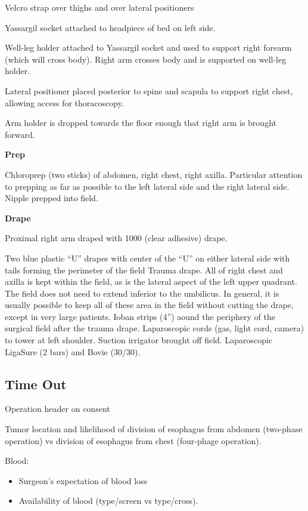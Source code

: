 \documentclass[
]{book}
\providecommand{\tightlist}{%
  \setlength{\itemsep}{0pt}\setlength{\parskip}{0pt}}
\begin{document}
Velcro strap over thighs and over lateral positioners

Yassargil socket attached to headpiece of bed on left side.

Well-leg holder attached to Yassargil socket and used to support right forearm (which will cross body). Right arm crosses body and is supported on well-leg holder.

Lateral positioner placed posterior to spine and scapula to support right chest, allowing access for thoracoscopy.

Arm holder is dropped towards the floor enough that right arm is brought forward.

\textbf{Prep}

Chloroprep (two sticks) of abdomen, right chest, right axilla. Particular attention to prepping as far as possible to the left lateral side and the right lateral side. Nipple prepped into field.

\textbf{Drape}

Proximal right arm draped with 1000 (clear adhesive) drape.

Two blue plastic ``U'' drapes with center of the ``U'' on either lateral side with tails forming the perimeter of the field Trauma drape. All of right chest and axilla is kept within the field, as is the lateral aspect of the left upper quadrant. The field does not need to extend inferior to the umbilicus. In general, it is usually possible to keep all of these area in the field without cutting the drape, except in very large patients. Ioban strips (4'') aound the periphery of the surgical field after the trauma drape. Laparoscopic cords (gas, light cord, camera) to tower at left shoulder. Suction irrigator brought off field. Laparoscopic LigaSure (2 bars) and Bovie (30/30).

\hypertarget{time-out}{%
\subsection{Time Out}\label{time-out}}

Operation header on consent

Tumor location and likelihood of division of esophagus from abdomen (two-phase operation) vs division of esophagus from chest (four-phage operation).

Blood:

\begin{itemize}
\tightlist
\item
  Surgeon's expectation of blood loss
\item
  Availability of blood (type/screen vs type/cross).
\end{itemize}
\end{document}
